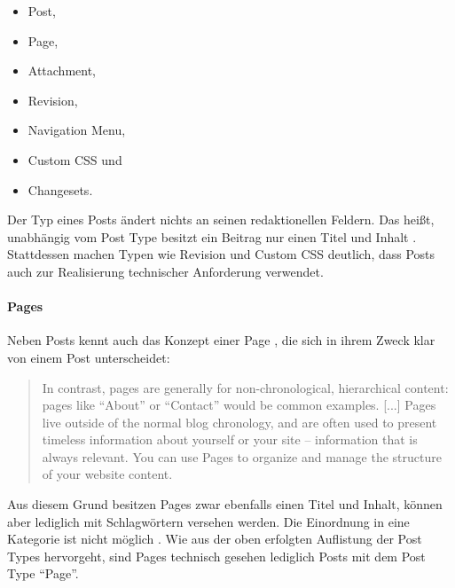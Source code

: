         \begin{itemize}
            \item Post,
            \item Page,
            \item Attachment,
            \item Revision,
            \item Navigation Menu,
            \item Custom CSS und
            \item Changesets.
        \end{itemize}

        Der Typ eines Posts ändert nichts an seinen redaktionellen Feldern.
        Das heißt, unabhängig vom Post Type besitzt ein Beitrag nur
        einen Titel und Inhalt
        \cite[Kapitel "`Posts"' \& "`Post Types"']{wordpress:codex}.
        Stattdessen machen Typen wie Revision und Custom CSS deutlich,
        dass {\wordpress} Posts auch zur Realisierung technischer Anforderung verwendet.

        \paragraph*{Pages}
        Neben Posts kennt {\wordpress} auch das Konzept einer Page \cite[Kapitel "`Pages"']{wordpress:codex},
        die sich in ihrem Zweck klar von einem Post unterscheidet:

        \begin{quote}
            In contrast, pages are generally for non-chronological,
            hierarchical content: pages like "`About"' or "`Contact"'
            would be common examples.
            [...]
            Pages live outside of the normal blog chronology,
            and are often used to present timeless information about
            yourself or your site -- information that is always relevant.
            You can use Pages to organize and manage the structure of your website content.
        \end{quote}

        Aus diesem Grund besitzen Pages zwar ebenfalls einen Titel und Inhalt,
        können aber lediglich mit Schlagwörtern versehen werden.
        Die Einordnung in eine Kategorie ist nicht möglich
        \cite[Kapitel "`Pages"']{wordpress:codex}.
        Wie aus der oben erfolgten Auflistung der Post Types hervorgeht,
        sind Pages technisch gesehen lediglich Posts mit dem Post Type "`Page"'.

